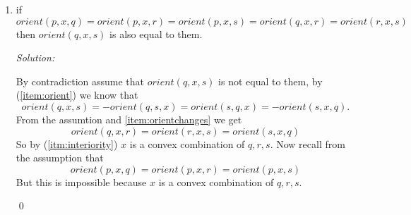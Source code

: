 \documentclass[a4paper, 8pt, oneside]{article}
\newenvironment{sol}
    {\emph{Solution:}
    }
    {
    \qed
    }
\begin{document}
\begin{enumerate}
\begin{enumerate}
\begin{sol}
\begin{align*}
{\begin{bmatrix}
    p &x & q
\end{bmatrix} + det \begin{bmatrix}
    1 & 1 & 1\\
    r &x & p
\end{bmatrix} + det \begin{bmatrix}
    1 & 1 & 1\\
    q &x & r
\end{bmatrix}}{det \begin{bmatrix}
    1 & 1 & 1\\
    r &q & p
\end{bmatrix}}
\\&= 1 && (\ref{interiority})
\end{align*}
Moreover recall that all coefficients have the same sign in the numerator and in the denominator so all of them most be positive, therefore this is convex combination.
\end{sol}
\item if $orient(p,x,q) = orient(p,x,r) = orient(p,x,s) = orient(q,x,r) = orient(r,x,s)$ then $orient(q,x,s)$ is also equal to them.

\begin{sol}
By contradiction assume that $orient(q,x,s)$ is not equal to them, by (\ref{item:orient}) we know that
\begin{equation}\label{item:orientchanges}
orient(q,x,s) = -orient(q,s,x) = orient(s,q,x) = -orient(s,x,q).
\end{equation}
From the assumtion and \ref{item:orientchanges} we get
\begin{equation*}
 orient(q,x,r) = orient(r,x,s) = orient(s,x,q)
\end{equation*}
So by (\ref{itm:interiority}) $x$ is a convex combination of $q,r,s$.
Now recall from the assumption that
\begin{equation*}
orient(p,x,q) = orient(p,x,r) = orient(p,x,s)
\end{equation*}
But this is impossible because $x$ is a convex combination of $q,r,s$.
\end{sol}
\end{enumerate}

\end{enumerate}
\end{document}
